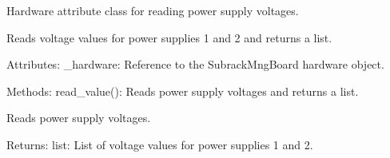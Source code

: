 \documentclass[letterpaper,10pt,english]{sphinxmanual}
\begin{document}
\begin{fulllineitems}
\label{\detokenize{webserverdocs:subrack_hardware.PSVoltage}}
\pysigstartsignatures
{}
\pysigstopsignatures
\sphinxAtStartPar
Hardware attribute class for reading power supply voltages.

\sphinxAtStartPar
Reads voltage values for power supplies 1 and 2 and returns a list.

\sphinxAtStartPar
Attributes:
\sphinxhyphen{} \_hardware: Reference to the SubrackMngBoard hardware object.

\sphinxAtStartPar
Methods:
\sphinxhyphen{} read\_value(): Reads power supply voltages and returns a list.

\begin{fulllineitems}
\label{\detokenize{webserverdocs:subrack_hardware.PSVoltage.read_value}}
\pysigstartsignatures
{}
\pysigstopsignatures
\sphinxAtStartPar
Reads power supply voltages.

\sphinxAtStartPar
Returns:
list: List of voltage values for power supplies 1 and 2.

\end{fulllineitems}


\end{fulllineitems}

\end{document}
